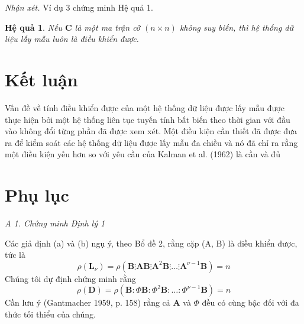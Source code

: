 \documentclass[12pt,a4paper]{article}
\newtheorem{hq}{Hệ quả}
\begin{document}


\textit{Nhận xét.} Ví dụ 3 chứng minh Hệ quả 1.


\begin{hq}
Nếu $\boldsymbol{C}$ là một ma trận cỡ $(n \times n)$ không suy biến, thì hệ thống dữ liệu lấy mẫu luôn là điều khiển được.
\end{hq}


\section{Kết luận}

Vấn đề về tính điều khiển được của một hệ thống dữ liệu được lấy mẫu được thực hiện bởi một hệ thống liên tục tuyến tính bất biến theo thời gian với đầu vào không đổi từng phần đã được xem xét. Một điều kiện cần thiết đã được đưa ra để kiểm soát các hệ thống dữ liệu được lấy mẫu đa chiều và nó đã chỉ ra rằng một điều kiện yếu hơn so với yêu cầu của Kalman et al. (1962) là cần và đủ

\section*{Phụ lục}


\textit{A 1. Chứng minh Định lý 1}

Các giả định (a) và (b) ngụ ý, theo Bổ đề 2, rằng cặp (A, B) là điều khiển được, tức là
\begin{equation}\label{pt11}\tag{11}
	\rho\left(\mathbf{L}_\nu\right)=\rho\left(\mathbf{B} \vdots \mathbf{A B} \vdots \mathbf{A}^2 \mathbf{B} \vdots \ldots \vdots \mathbf{A}^{\nu-1} \mathbf{B}\right)=n
\end{equation}
Chúng tôi dự định chứng minh rằng
$$
\rho(\mathbf{D})=\rho\left(\mathbf{B}: \Phi \mathbf{B}: \Phi^2 \mathbf{B}: \ldots: \Phi^{\nu-1 } \mathbf{B}\right)=n
$$
Cần lưu ý (Gantmacher 1959, p. 158) rằng cả $\mathbf{A}$ và $\Phi$ đều có cùng bậc đối với đa thức tối thiểu của chúng.
\end{document}

